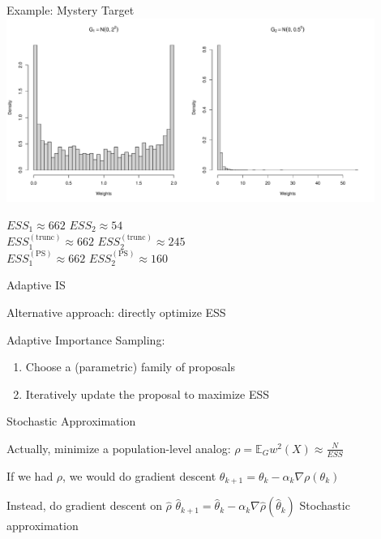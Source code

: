 \documentclass[14pt]{beamer}
\newcommand{\bE}{\mathbb{E}}
\begin{document}
\begin{frame}{Example: Mystery Target}
    \centering
    \includegraphics[height=0.5\textheight, width=0.9\textwidth]{Figures/Wt Hist - Pareto Smooth.pdf}\newline
    \begin{outline}
        $ESS_1 \approx 662$ \hspace{2.5cm} $ESS_2 \approx 54$\\
        $ESS_1^{(\mathrm{trunc})} \approx 662$ \hspace{2.5cm} $ESS_2^{(\mathrm{trunc})} \approx 245$\\
        $ESS_1^{(\mathrm{PS})} \approx 662$ \hspace{2.5cm} $ESS_2^{(\mathrm{PS})} \approx 160$
    \end{outline}
\end{frame}


\begin{frame}{Adaptive IS}
    \begin{outline}
        \1 Alternative approach: directly optimize ESS \newline

        \1 Adaptive Importance Sampling: 
            \2 \citep{Aky21} \newline
    \end{outline}

    \begin{enumerate}
        [default]
        \item Choose a (parametric) family of proposals
        \item Iteratively update the proposal to maximize ESS
    \end{enumerate}
\end{frame}

\begin{frame}{Stochastic Approximation}
    \begin{outline}
        \1 Actually, minimize a population-level analog: 
            \2 $\rho = \bE_G w^2(X) \approx \frac{N}{ESS}$ \newline

        \1 If we had $\rho$, we would do gradient descent
            \2 $\theta_{k+1} = \theta_k - \alpha_k \nabla \rho(\theta_k)$ \newline

        \1 Instead, do gradient descent on $\hat{\rho}$
            \2 $\hat{\theta}_{k+1} = \hat{\theta}_k - \alpha_k \nabla \hat{\rho}(\hat{\theta}_k)$ 
        \1 Stochastic approximation
    \end{outline}
\end{frame}
\end{document}
